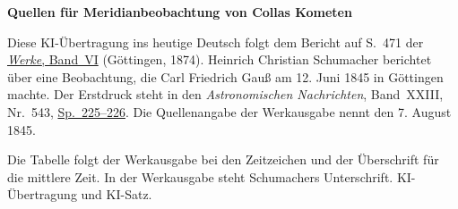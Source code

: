 \clearpage\thispagestyle{empty}
\begin{center}\textbf{Quellen für Meridianbeobachtung von Collas Kometen}\end{center}
\noindent Diese KI-Übertragung ins heutige Deutsch folgt dem Bericht auf S.~471 der \href{https://gdz.sub.uni-goettingen.de/id/PPN236007467}{\textit{Werke}, Band~VI} (Göttingen, 1874). Heinrich Christian Schumacher berichtet über eine Beobachtung, die Carl Friedrich Gauß am 12. Juni 1845 in Göttingen machte. Der Erstdruck steht in den \textit{Astronomischen Nachrichten}, Band~XXIII, Nr.~543, \href{https://api.digitale-sammlungen.de/iiif/image/v2/bsb10049448_00121/full/1800,/0/default.jpg}{Sp.~225--226}. Die Quellenangabe der Werkausgabe nennt den 7. August 1845.
\par\smallskip\noindent Die Tabelle folgt der Werkausgabe bei den Zeitzeichen und der Überschrift für die mittlere Zeit. In der Werkausgabe steht Schumachers Unterschrift. KI-Übertragung und KI-Satz.
\clearpage
